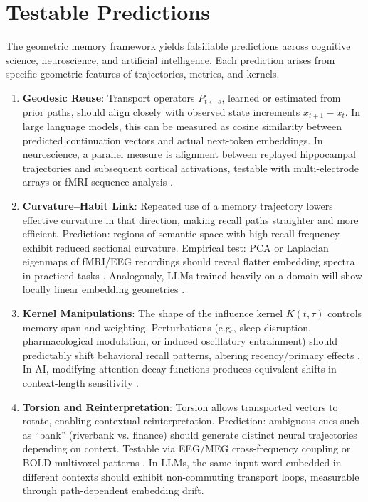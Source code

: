 \documentclass[a4paper,12pt]{article}
\begin{document}
\section{Testable Predictions}
The geometric memory framework yields falsifiable predictions across
cognitive science, neuroscience, and artificial intelligence. Each prediction
arises from specific geometric features of trajectories, metrics, and kernels.

\begin{enumerate}
    \item \textbf{Geodesic Reuse}: 
    Transport operators $P_{t \leftarrow s}$, learned or estimated from prior paths,
    should align closely with observed state increments $x_{t+1}-x_t$.
    In large language models, this can be measured as cosine similarity between
    predicted continuation vectors and actual next-token embeddings. 
    In neuroscience, a parallel measure is alignment between replayed hippocampal
    trajectories and subsequent cortical activations, testable with multi-electrode arrays
    or fMRI sequence analysis \citep{davidson2009hippocampal}.

    \item \textbf{Curvature--Habit Link}: 
    Repeated use of a memory trajectory lowers effective curvature in that direction,
    making recall paths straighter and more efficient.
    Prediction: regions of semantic space with high recall frequency exhibit reduced
    sectional curvature. Empirical test: PCA or Laplacian eigenmaps of fMRI/EEG
    recordings should reveal flatter embedding spectra in practiced tasks 
    \citep{hassabis2007patients}. Analogously, LLMs trained heavily on a domain
    will show locally linear embedding geometries \citep{do_carmo1992riemannian}.

    \item \textbf{Kernel Manipulations}: 
    The shape of the influence kernel $K(t,\tau)$ controls memory span and weighting. 
    Perturbations (e.g., sleep disruption, pharmacological modulation, or induced oscillatory
    entrainment) should predictably shift behavioral recall patterns, altering recency/primacy
    effects \citep{stickgold2005sleep}. In AI, modifying attention decay functions 
    produces equivalent shifts in context-length sensitivity \citep{bahdanau2014neural}.

    \item \textbf{Torsion and Reinterpretation}: 
    Torsion allows transported vectors to rotate, enabling contextual reinterpretation.
    Prediction: ambiguous cues such as ``bank'' (riverbank vs. finance) should generate
    distinct neural trajectories depending on context. Testable via EEG/MEG 
    cross-frequency coupling or BOLD multivoxel patterns \citep{hassabis2007patients}. 
    In LLMs, the same input word embedded in different contexts should exhibit
    non-commuting transport loops, measurable through path-dependent embedding drift.


\end{enumerate}
\end{document}
